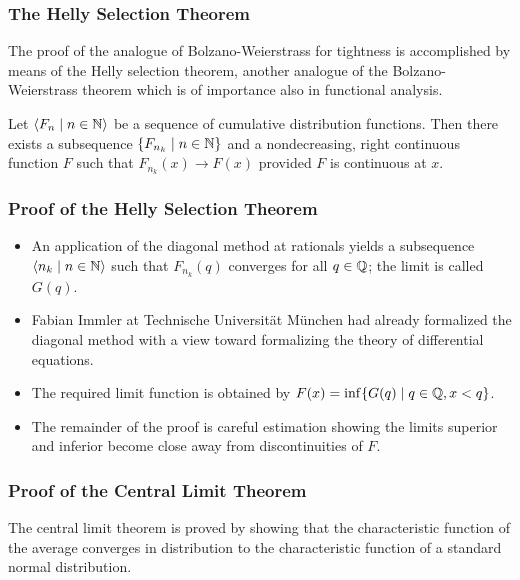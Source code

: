\documentclass{beamer}
\newcommand\bldseq[2]{\langle{#1}\mid{#2}\rangle}
\newcommand\bldset[2]{\{{#1}\mid{#2}\}}
\begin{document}
\begin{frame}
\frametitle{The Helly Selection Theorem}
The proof of the analogue of Bolzano-Weierstrass for tightness is accomplished by means of the Helly selection theorem, another analogue of the Bolzano-Weierstrass theorem which is of importance also in functional analysis. \pause

\begin{theorem}
Let $\bldseq{F_n}{n \in \N}$ be a sequence of cumulative distribution functions. Then there exists a subsequence $\bldset{F_{n_k}}{n \in \N}$ and a nondecreasing, right continuous function $F$ such that $F_{n_k}(x) \rightarrow F(x)$ provided $F$ is continuous at $x$.
\end{theorem}
\end{frame}

\begin{frame}
\frametitle{Proof of the Helly Selection Theorem}

\begin{itemize}
\item An application of the diagonal method at rationals yields a subsequence $\bldseq{n_k}{n \in \N}$ such that $F_{n_k}(q)$ converges for all $q \in \mathbb{Q}$; the limit is called $G(q)$. \pause
\item Fabian Immler at Technische Universit\"at M\"unchen had already formalized the diagonal method with a view toward formalizing the theory of differential equations. \pause
\item The required limit function is obtained by $F(x) = \inf \bldset{G(q)}{q \in \Q, x < q}$. \pause
\item The remainder of the proof is careful estimation showing the limits superior and inferior become close away from discontinuities of $F$.
\end{itemize}
\end{frame}

\begin{frame}
\frametitle{Proof of the Central Limit Theorem}
The central limit theorem is proved by showing that the characteristic function of the average converges in distribution to the characteristic function of a standard normal distribution. \pause
\end{frame}
\end{document}
